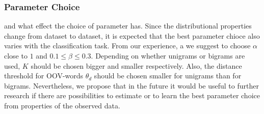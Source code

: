 \subsubsection{Parameter Choice}
and what effect the choice of parameter has.
Since the distributional properties change from dataset to dataset, it is expected that the best parameter chioce also varies with the 
classification task.  From our experience, a we suggest to choose $\alpha$ close to $1$ and $0.1 \leq \beta \leq 0.3$. 
Depending on whether unigrams or bigrams are used, $K$ should be chosen bigger and smaller respectively. Also, the distance threshold for OOV-words $\theta_d$
should be chosen smaller for unigrams than for bigrams. Nevertheless, we propose that in the future it would be useful to further research if there are possibilities
to estimate or to learn the best parameter choice from properties of the observed data.

  
 
     